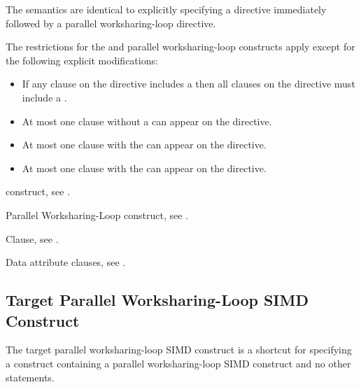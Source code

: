 \descr
The semantics are identical to explicitly specifying a  directive
immediately followed by a parallel worksharing-loop directive.


\restrictions
The restrictions for the  and parallel worksharing-loop constructs 
apply except for the following explicit modifications:

\begin{itemize}
\item If any  clause on the directive includes a
       then all  clauses
      on the directive must include a .
\item At most one  clause without a
       can appear on the directive.
\item At most one  clause with the 
       can appear on the directive.
\item At most one  clause with the 
       can appear on the directive.
\end{itemize}

\begin{crossrefs}
\item {} construct, see
.

\item Parallel Worksharing-Loop construct, see
.

\item {} Clause, see .

\item Data attribute clauses, see
.
\end{crossrefs}



\subsection{Target Parallel Worksharing-Loop SIMD Construct}
\label{subsec:Target Parallel Worksharing-Loop SIMD Construct}
\summary
The target parallel worksharing-loop SIMD construct is a shortcut for specifying 
a  construct containing a parallel worksharing-loop SIMD construct 
and no other statements.


